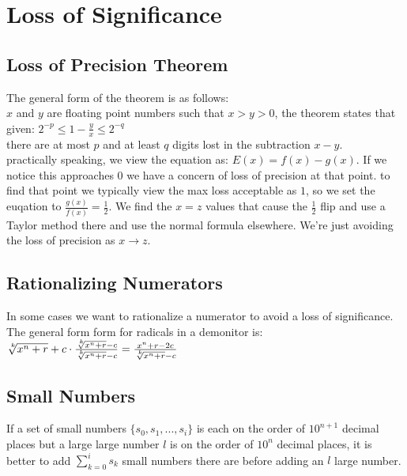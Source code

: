 \section{Loss of Significance}


\subsection*{Loss of Precision Theorem}
The general form of the theorem is as follows:\\
$x$ and $y$ are floating point numbers such that $x > y > 0$,
the theorem states that given:
$ 2^{-p} \leq 1 - \frac{y}{x} \leq 2^{-q} $\\
there are at most $p$ and at least $q$ digits lost in the subtraction $x-y$.\\

practically speaking, we view the equation as: $E(x) = f(x) - g(x)$. If
we notice this approaches $0$ we have a concern of loss of precision at that point.
to find that point we typically view the max loss acceptable as $1$, so we set
the euqation to $\frac{g(x)}{f(x)} = \frac{1}{2}$. We find the $x = z$ values that cause
the $\frac{1}{2}$ flip and use a Taylor method there and use the normal formula elsewhere.
We're just avoiding the loss of precision as $x \rightarrow z$.

\subsection*{Rationalizing Numerators}
In some cases we want to rationalize a numerator to avoid a loss of significance.
The general form form for radicals in a demonitor is:\\
$\sqrt[\leftroot{-2}\uproot{2}k]{x^n + r} + c  \cdot \frac{\sqrt[\leftroot{-2}\uproot{2}k]{x^n + r} - c}{\sqrt[\leftroot{-2}\uproot{2}k]{x^n + r} - c}   =  \frac{x^n + r -2c}{\sqrt[\leftroot{-2}\uproot{2}k]{x^n + r} - c}$\\

\subsection*{Small Numbers}
If a set of small numbers $\{s_0, s_1, ... , s_i\}$ is each on the order of $10^{n+1}$ decimal places but
a large large number $l$ is on the order of $10^{n}$ decimal places, it is better
to add $\sum_{k=0}^{i} s_k$ small numbers there are before
adding an $l$ large number.
